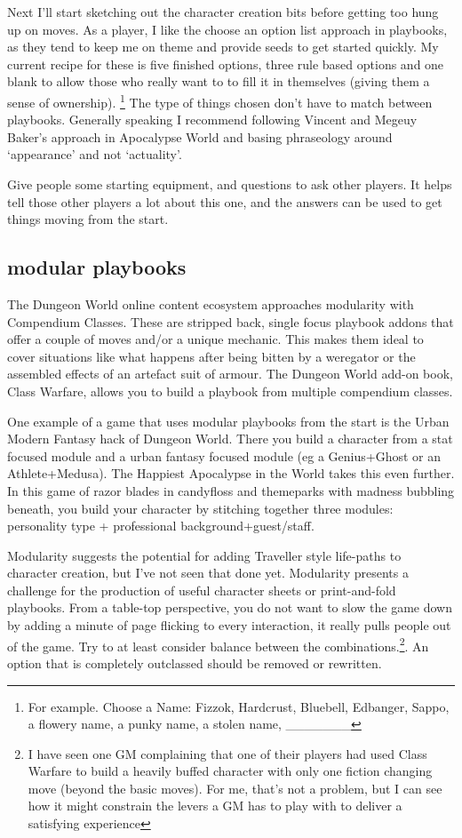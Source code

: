 \documentclass{tufte-handout}
\begin{document}
Next I'll start sketching out the character creation bits before getting too hung up on moves. 
As a player, I like the choose an option list approach in playbooks, as they tend to keep me on theme and provide seeds to get started quickly. My current recipe for these is five finished options, three rule based options and one blank to allow those who really want to to fill it in themselves (giving them a sense of ownership). \footnote{For example. Choose a Name: Fizzok, Hardcrust, Bluebell, Edbanger, Sappo, a flowery name, a punky name, a stolen name, \_\_\_\_\_\_\_}  The type of things chosen don't have to match between playbooks. Generally speaking I recommend following Vincent and Megeuy Baker's approach in Apocalypse World and basing phraseology around `appearance' and not `actuality'. 

Give people some starting equipment, and questions to ask other players. It helps tell those other players a lot about this one, and the answers can be used to get things moving from the start.

\subsection{modular playbooks}
The Dungeon World online content ecosystem approaches modularity with Compendium Classes. These are stripped back, single focus playbook addons that offer a couple of moves and/or a unique mechanic. This makes them ideal to cover situations like what happens after being bitten by a weregator or the assembled effects of an artefact suit of armour. The Dungeon World add-on book, Class Warfare, allows you to build a playbook from multiple compendium classes.

One example of a game that uses modular playbooks from the start is the Urban Modern Fantasy hack of Dungeon World. There you build a character from a stat focused module and a urban fantasy focused module (eg a Genius+Ghost or an Athlete+Medusa).  The Happiest Apocalypse in the World takes this even further. In this game of razor blades in candyfloss and themeparks with madness bubbling beneath, you build your character by stitching together three modules: personality type + professional background+guest/staff.

Modularity suggests the potential for adding Traveller style life-paths to character creation, but I've not seen that done yet. Modularity presents a challenge for the production of useful character sheets or print-and-fold playbooks. From a table-top perspective, you do not want to slow the game down by adding a minute of page flicking to every interaction, it really pulls people out of the game. Try to at least consider balance between the combinations.\footnote{I have seen one GM complaining that one of their players had used Class Warfare to build a heavily buffed character with only one fiction changing move (beyond the basic moves). For me, that's not a problem, but I can see how it might constrain the levers a GM has to play with to deliver a satisfying experience}. An option that is completely outclassed should be removed or rewritten. 
\end{document}
